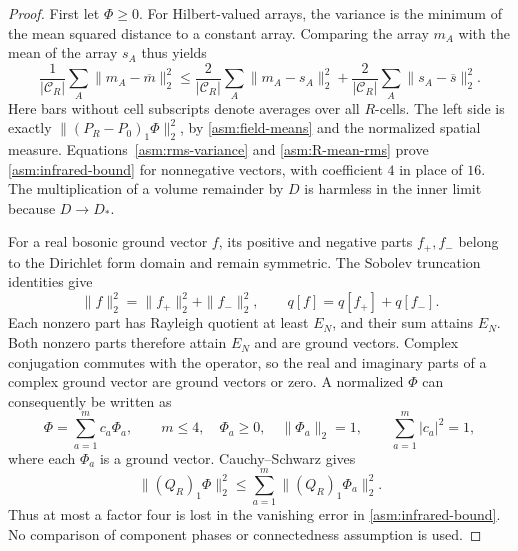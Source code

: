 \begin{proof}
First let $\Phi\ge0$. For Hilbert-valued arrays, the variance is the
minimum of the mean squared distance to a constant array. Comparing the
array $m_A$ with the mean of the array $s_A$ thus yields
\[
 \frac1{|\mathcal C_R|}\sum_A\|m_A-\overline m\|_2^2
 \le\frac2{|\mathcal C_R|}\sum_A\|m_A-s_A\|_2^2
      +\frac2{|\mathcal C_R|}\sum_A\|s_A-\overline s\|_2^2.
\]
Here bars without cell subscripts denote averages over all $R$-cells.
The left side is exactly $\|(P_R-P_0)_1\Phi\|_2^2$, by
\eqref{asm:field-means} and the normalized spatial measure.
Equations~\eqref{asm:rms-variance} and \eqref{asm:R-mean-rms} prove
\eqref{asm:infrared-bound} for nonnegative vectors, with coefficient $4$
in place of $16$. The multiplication
of a volume remainder by $D$ is harmless in the inner limit because
$D\to D_*$.

For a real bosonic ground vector $f$, its positive and negative parts
$f_+,f_-$ belong to the Dirichlet form domain and remain symmetric.
The Sobolev truncation identities give
\[
 \|f\|_2^2=\|f_+\|_2^2+\|f_-\|_2^2,
 \qquad q[f]=q[f_+]+q[f_-].
\]
Each nonzero part has Rayleigh quotient at least $E_N$, and their sum
attains $E_N$. Both nonzero parts therefore attain $E_N$ and are ground
vectors. Complex conjugation commutes with the operator, so the real
and imaginary parts of a complex ground vector are ground vectors or
zero. A normalized $\Phi$ can consequently be written as
\[
 \Phi=\sum_{a=1}^m c_a\Phi_a,
 \qquad m\le4,\quad \Phi_a\ge0,\quad\|\Phi_a\|_2=1,
 \qquad \sum_{a=1}^m|c_a|^2=1,
\]
where each $\Phi_a$ is a ground vector. Cauchy--Schwarz gives
\[
 \|(Q_R)_1\Phi\|_2^2
       \le\sum_{a=1}^m\|(Q_R)_1\Phi_a\|_2^2.
\]
Thus at most a factor four is lost in the vanishing error in
\eqref{asm:infrared-bound}. No comparison of component phases or
connectedness assumption is used.
\end{proof}

